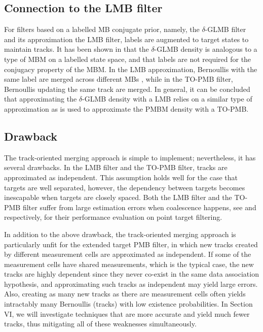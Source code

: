 \documentclass[journal]{IEEEtran}
\begin{document}
\subsection{Connection to the LMB filter}
For filters based on a labelled MB conjugate prior, namely, the $\delta$-GLMB filter and its approximation the LMB filter, labels are augmented to target states to maintain tracks. It has been shown in \cite{pmbmpoint2} that the $\delta$-GLMB density is analogous to a type of MBM on a labelled state space, and that labels are not required for the conjugacy property of the MBM. In the LMB approximation, Bernoullis with the same label are merged across different MBs \cite{lmb}, while in the TO-PMB filter, Bernoullis updating the same track are merged. In general, it can be concluded that approximating the $\delta$-GLMB density with a LMB relies on a similar type of approximation as is used to approximate the PMBM density with a TO-PMB. 


\subsection{Drawback}
The track-oriented merging approach is simple to implement; nevertheless, it has several drawbacks. In the LMB filter and the TO-PMB filter, tracks are approximated as independent. This assumption holds well for the case that targets are well separated, however, the dependency between targets becomes inescapable when targets are closely spaced. Both the LMB filter and the TO-PMB filter suffer from large estimation errors when coalescence happens, see \cite{performanceevaluation} and \cite{pmbmpoint} respectively, for their performance evaluation on point target filtering. 

In addition to the above drawback, the track-oriented merging approach is particularly unfit for the extended target PMB filter, in which new tracks created by different measurement cells are approximated as independent. If some of the measurement cells have shared measurements, which is the typical case, the new tracks are highly dependent since they never co-exist in the same data association hypothesis, and approximating such tracks as independent may yield large errors. Also, creating as many new tracks as there are measurement cells often yields intractably many Bernoullis (tracks) with low existence probabilities. In Section VI, we will investigate techniques that are more accurate and yield much fewer tracks, thus mitigating all of these weaknesses simultaneously.
\end{document}
